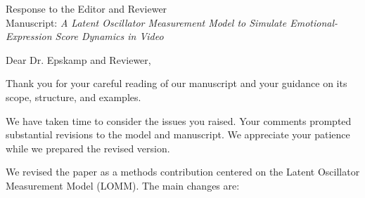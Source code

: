 \documentclass[11pt]{article}
\begin{document}
\begin{center}
{\Large Response to the Editor and Reviewer}\\[0.5em]
Manuscript: \textit{A Latent Oscillator Measurement Model to Simulate Emotional-Expression Score Dynamics in Video}
\end{center}

Dear Dr. Epskamp and Reviewer,

Thank you for your careful reading of our manuscript and your guidance on its scope, structure, and examples.

We have taken time to consider the issues you raised. Your comments prompted substantial revisions to the model and manuscript. We appreciate your patience while we prepared the revised version.

We revised the paper as a methods contribution centered on the Latent Oscillator Measurement Model (LOMM). The main changes are:
\end{document}
